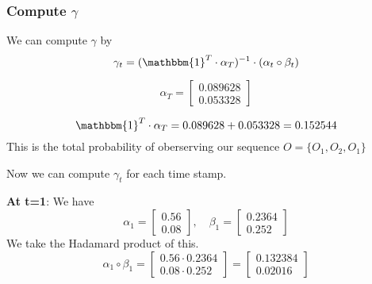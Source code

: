 \subsubsection{Compute $\gamma$}
We can compute $\gamma$ by 
\[
\gamma_t = (\mathbbm{1}^T \cdot \alpha_T)^{-1} \cdot (\alpha_t \circ \beta_t)
\]

\[
\alpha_T = 
    \begin{bmatrix}
        0.089628 \\ 0.053328
    \end{bmatrix}
\]

\[
    \mathbbm{1}^T \cdot \alpha_T = 0.089628 + 0.053328 = 0.152544
\]
This is the total probability of oberserving our sequence $O = \{O_1, O_2, O_1\}$

Now we can compute $\gamma_t$ for each time stamp.

\textbf{At t=1}:
We have 
\[
    \alpha_1 = \begin{bmatrix}
        0.56 \\ 0.08
    \end{bmatrix}, \quad \beta_1 = \begin{bmatrix}
        0.2364 \\ 0.252
    \end{bmatrix}
\]
We take the Hadamard product of this.
\[
\alpha_1 \circ \beta_1 = \begin{bmatrix}
    0.56 \cdot 0.2364 \\ 0.08 \cdot 0.252 
\end{bmatrix} = \begin{bmatrix}
    0.132384 \\ 0.02016
\end{bmatrix}
\]

